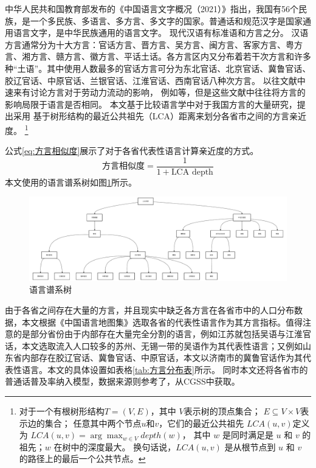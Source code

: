 \documentclass[a4paper, zihao=-4, fontset = mac, oneside]{ctexbook} %
\let\oldfootnote\footnote
\renewcommand{\footnote}[1]{%
  \oldfootnote{\setstretch{1.5}#1}%
}
\begin{document}
中华人民共和国教育部发布的《中国语言文字概况（2021）》指出，我国有56个民族，是一个多民族、多语言、多方言、多文字的国家。普通话和规范汉字是国家通用语言文字，是中华民族通用的语言文字。
现代汉语有标准语和方言之分。
汉语方言通常分为十大方言：官话方言、晋方言、吴方言、闽方言、客家方言、粤方言、湘方言、赣方言、徽方言、平话土话。各方言区内又分布着若干次方言和许多种“土语”。其中使用人数最多的官话方言可分为东北官话、北京官话、冀鲁官话、胶辽官话、中原官话、兰银官话、江淮官话、西南官话八种次方言。
以往文献中速来有讨论方言对于劳动力流动的影响，
例如\textcite{HuangZongYeFangYanDuiShengJiRenKouQianYiDeYingXiang2020,LiQinFangYanPuTongHuaYuZhongGuoLaoDongLiQuYuLiuDong2014}等，但是这些文献中往往将方言的影响局限于语言是否相同。
本文基于比较语言学中对于我国方言的大量研究，提出采用
基于树形结构的最近公共祖先（LCA）距离来划分各省市之间的方言亲近度。
\footnote{
对于一个有根树形结构$T=(V,E)$，其中
$V$表示树的顶点集合；
$E\subseteq V \times V$表示边的集合；
任意其中两个节点$u$和$v$，它们的最近公共祖先 $LCA(u,v) $定义为
$LCA(u,v)=\arg \max_{w\in V} depth(w)$，
其中 $w$ 是同时满足是 $u$ 和 $v$ 的祖先；$w$ 在树中的深度最大。
换句话说，$LCA(u,v)$ 是从根节点到 $u$ 和 $v$ 的路径上的最后一个公共节点。
}
公式\ref{eq:方言相似度}展示了对于各省代表性语言计算亲近度的方式。
\begin{equation}
  \label{eq:方言相似度}
  \text{方言相似度}=\frac{1}{1+\text{LCA depth}}
\end{equation}
本文使用的语言谱系树如图\ref{fig:linguistic_tree}所示。
\begin{figure}[!ht]
\centering
\caption{语言谱系树}
\label{fig:linguistic_tree}
\includegraphics[width=\textwidth]{images/linguisitc_tree.drawio.pdf}
\end{figure}
由于各省之间存在大量的方言，并且现实中缺乏各方言在各省市中的人口分布数据，本文根据《中国语言地图集》选取各省的代表性语言作为其方言指标。值得注意的是部分省份由于内部存在大量完全分割的语言，例如江苏就包括吴语与江淮官话，本文选取流入人口较多的苏州、无锡一带的吴语作为其代表性语言；又例如山东省内部存在胶辽官话、冀鲁官话、中原官话，本文以济南市的冀鲁官话作为其代表性语言。本文的具体设置如表格\ref{tab:方言分布表}所示。
同时本文还将各省市的普通话普及率纳入模型，数据来源则参考了\textcite{YuWeiQiGuoMinPuTongHuaNengLiDeJiBenZhuangKuangYuFaZhanTaiShi2018}，从CGSS中获取。
\end{document}
